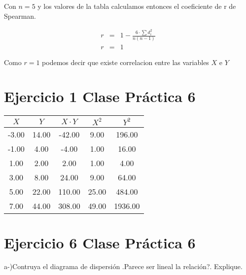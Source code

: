 \documentclass{article}
\begin{document}
	\begin{flushleft}
		Con $n=5$ y los valores de la tabla calculamos entonces el coeficiente de r de Spearman.
	\end{flushleft}
	
	\begin{equation*}
		\begin{array}{rcl}
		r & = &\displaystyle 1- \frac{6 \cdot \sum d_{i}^{2}}{n\left(n-1\right)} \\
		r & = & 1 
		\end{array}
	\end{equation*}
	
	\begin{flushleft}
			Como $r=1$ podemos decir que existe correlacion entre las variables $X$ e $Y$
	\end{flushleft}

	\section*{Ejercicio 1 Clase Pr\'actica 6 }
	
	\begin{table}[ht]
		\centering		
		\begin{tabular}{|ccccc|}
			\hline
			\rowcolor[gray]{0.8} $X$ & $Y$ & $X\cdot Y$ & $X^2$ & $Y^2$ \\ 
			\hline
			-3.00 & 14.00 & -42.00 & 9.00 & 196.00 \\ 
			-1.00 & 4.00 & -4.00 & 1.00 & 16.00 \\ 
			1.00 & 2.00 & 2.00 & 1.00 & 4.00 \\ 
			3.00 & 8.00 & 24.00 & 9.00 & 64.00 \\ 
			5.00 & 22.00 & 110.00 & 25.00 & 484.00 \\ 
			\hline
			\rowcolor[gray]{0.9} 7.00 & 44.00 & 308.00 & 49.00 & 1936.00 \\ 
			\hline
		\end{tabular}
	\end{table}


	
	\section*{Ejercicio 6 Clase Pr\'actica 6 }

		\begin{flushleft}
			a-)Contruya el diagrama de dispersi\'on .Parece ser lineal la relaci\'on?. Explique.
		\end{flushleft}
\end{document}
